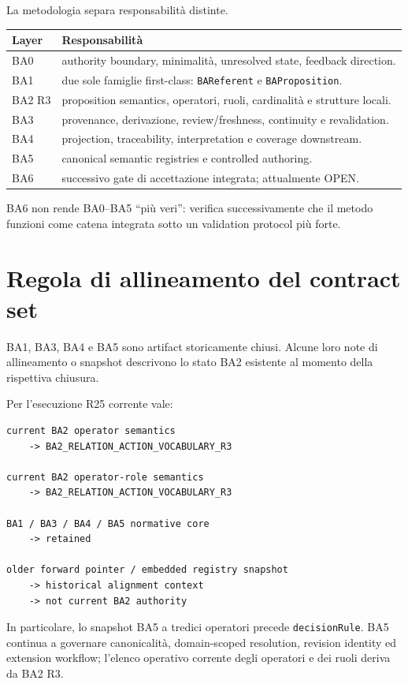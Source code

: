 \documentclass[11pt,a4paper]{article}
\newcommand{\code}[1]{\nolinkurl{#1}}
\begin{document}
La metodologia separa responsabilità distinte.

\begin{longtable}{L{0.13\textwidth}L{0.75\textwidth}}
\toprule
\textbf{Layer} & \textbf{Responsabilità} \\
\midrule\endhead
BA0 & authority boundary, minimalità, unresolved state, feedback direction. \\
BA1 & due sole famiglie first-class: \code{BAReferent} e \code{BAProposition}. \\
BA2 R3 & proposition semantics, operatori, ruoli, cardinalità e strutture locali. \\
BA3 & provenance, derivazione, review/freshness, continuity e revalidation. \\
BA4 & projection, traceability, interpretation e coverage downstream. \\
BA5 & canonical semantic registries e controlled authoring. \\
BA6 & successivo gate di accettazione integrata; attualmente OPEN. \\
\bottomrule
\end{longtable}

BA6 non rende BA0--BA5 ``più veri'': verifica successivamente che il metodo funzioni come catena integrata sotto un validation protocol più forte.

\section{Regola di allineamento del contract set}

BA1, BA3, BA4 e BA5 sono artifact storicamente chiusi. Alcune loro note di allineamento o snapshot descrivono lo stato BA2 esistente al momento della rispettiva chiusura.

Per l'esecuzione R25 corrente vale:

\begin{lstlisting}
current BA2 operator semantics
    -> BA2_RELATION_ACTION_VOCABULARY_R3

current BA2 operator-role semantics
    -> BA2_RELATION_ACTION_VOCABULARY_R3

BA1 / BA3 / BA4 / BA5 normative core
    -> retained

older forward pointer / embedded registry snapshot
    -> historical alignment context
    -> not current BA2 authority
\end{lstlisting}

In particolare, lo snapshot BA5 a tredici operatori precede \code{decisionRule}. BA5 continua a governare canonicalità, domain-scoped resolution, revision identity ed extension workflow; l'elenco operativo corrente degli operatori e dei ruoli deriva da BA2 R3.
\end{document}

